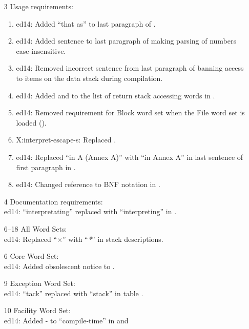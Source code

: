 \begin{itemize}
	\item[3] Usage requirements:					%
		\begin{enumerate}
		\item \textsf{ed14}: Added ``that  as'' to last paragraph
			of .
		\item \textsf{ed14}: Added sentence to last paragraph of  making
			parsing of numbers case-insensitive.
		\item \textsf{ed14}: Removed incorrect sentence from last paragraph of
			 banning access to items on the data stack during
			compilation.
		\item \textsf{ed14}: Added  and 
			to the list of return stack accessing words in .
		\item \textsf{ed14}: Removed requirement for Block word set when
			the File word set is loaded ().
		\item \textsf{X:interpret-escape-s}: Replaced .
		\item \textsf{ed14}: Replaced ``in A (Annex A)'' with ``in Annex A'' in
			last sentence of first paragraph in .
		\item \textsf{ed14}: Changed reference to BNF notation in .
		\end{enumerate}

	\item[4] Documentation requirements:			%
		~ \\
		\textsf{ed14}: ``interpretating'' replaced with ``interpreting'' in
		.
		
	\item[6--18] All Word Sets: ~\\
		\textsf{ed14}: Replaced ``$\times$'' with ``\emph{*}'' in stack descriptions.

	\item[6] Core Word Set:						%
		~\\ \textsf{ed14}: Added obsolescent notice to .
	\item[9] Exception Word Set:					%
		~ \\ \textsf{ed14}: ``tack'' replaced with ``stack'' in table .
		
	\item[10] Facility Word Set:					%
		~ \\
		\textsf{ed14}: Added - to ``compile-time'' in
			 and 


\end{itemize}
